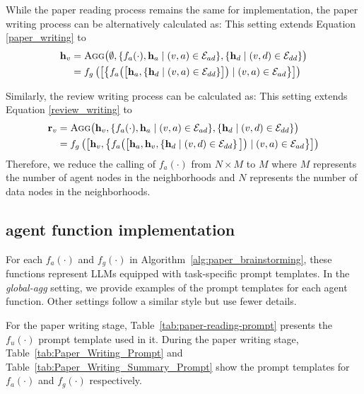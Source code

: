 While the paper reading process remains the same for implementation, the paper writing process can be alternatively calculated as:
This setting extends Equation \ref{paper_writing} to
\begin{equation}
\begin{split}
    \mathbf{h}_{v} & = \textsc{Agg}\big( \emptyset, \{f_a(\cdot), \mathbf{h}_a \mid (v,a) \in \mathcal{E}_{ad}\}, \{\mathbf{h}_d \mid (v,d) \in \mathcal{E}_{dd}\}\big) \\
    & = f_g\left(\left[\left\{f_a\big(\big[\mathbf{h}_a, \{\mathbf{h}_d \mid (v, a) \in \mathcal{E}_{dd}\}\big]\big) \mid (v,a) \in \mathcal{E}_{ad}\right\}\right]\right)
\end{split}
\label{paper_writing_efficient}
\end{equation}

Similarly, the review writing process can be calculated as:
This setting extends Equation \ref{review_writing} to
\begin{equation}
\begin{split}
    \mathbf{r}_{v} & = \textsc{Agg}\big( \mathbf{h}_v, \{f_a(\cdot), \mathbf{h}_a \mid (v,a) \in \mathcal{E}_{ad}\}, \{\mathbf{h}_d \mid (v,d) \in \mathcal{E}_{dd}\}\big) \\
    & = f_g\left(\left[\mathbf{h}_v, \left\{f_a\big(\big[\mathbf{h}_a, \mathbf{h}_v, \left\{\mathbf{h}_d \mid (v,d) \in \mathcal{E}_{dd} \right\} \big] \big) \mid (v,a) \in \mathcal{E}_{ad}\right\}\right]\right)
\end{split}
\label{review_writing_efficient}
\end{equation}
Therefore, we reduce the calling of $f_a(\cdot)$ from $N \times M$ to $M$ where $M$ represents the number of agent nodes in the neighborhoods and $N$ represents the number of data nodes in the neighborhoods.


\subsection{\envname agent function implementation}
\label{agent-function-implementation}
For each $f_a(\cdot)$ and $f_g(\cdot)$ in Algorithm~\ref{alg:paper_brainstorming}, these functions represent LLMs equipped with task-specific prompt templates. In the \textit{global-agg} setting, we provide examples of the prompt templates for each agent function. Other settings follow a similar style but use fewer details.

For the paper writing stage, Table~\ref{tab:paper-reading-prompt} presents the $f_u(\cdot)$ prompt template used in it. During the paper writing stage, Table~\ref{tab:Paper_Writing_Prompt} and Table~\ref{tab:Paper_Writing_Summary_Prompt} show the prompt templates for $f_a(\cdot)$ and $f_g(\cdot)$ respectively.

